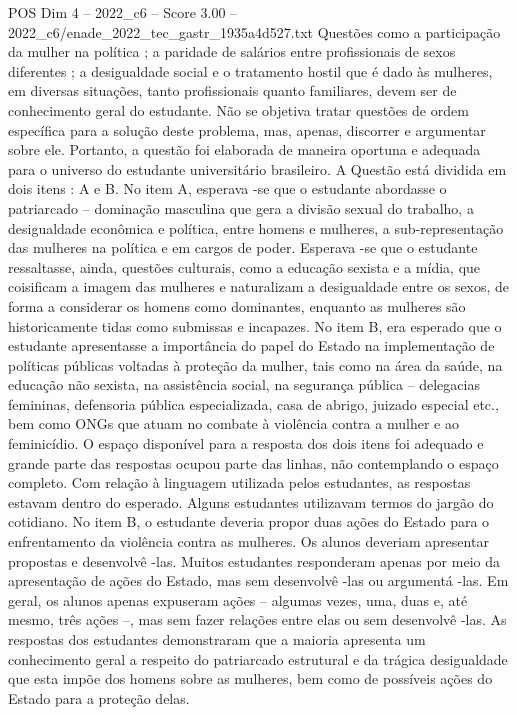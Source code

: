 \begin{textsample}{POS Dim 4 – 2022\_c6 – Score 3.00 – 2022\_c6/enade\_2022\_tec\_gastr\_1935a4d527.txt}
Questões como a participação da mulher na política ; a paridade de salários entre profissionais de sexos diferentes ; a desigualdade social e o tratamento hostil que é dado às mulheres, em diversas situações, tanto profissionais quanto familiares, devem ser de conhecimento geral do estudante.
Não se objetiva tratar questões de ordem específica para a solução deste problema, mas, apenas, discorrer e argumentar sobre ele.
Portanto, a questão foi elaborada de maneira oportuna e adequada para o universo do estudante universitário brasileiro.
A Questão está dividida em dois itens : A e B.
No item A, esperava -se que o estudante abordasse o patriarcado – dominação masculina que gera a divisão sexual do trabalho, a desigualdade econômica e política, entre homens e mulheres, a sub-representação das mulheres na política e em cargos de poder.
Esperava -se que o estudante ressaltasse, ainda, questões culturais, como a educação sexista e a mídia, que coisificam a imagem das mulheres e naturalizam a desigualdade entre os sexos, de forma a considerar os homens como dominantes, enquanto as mulheres são historicamente tidas como submissas e incapazes.
No item B, era esperado que o estudante apresentasse a importância do papel do Estado na implementação de políticas públicas voltadas à proteção da mulher, tais como na área da saúde, na educação não sexista, na assistência social, na segurança pública – delegacias femininas, defensoria pública especializada, casa de abrigo, juizado especial etc., bem como ONGs que atuam no combate à violência contra a mulher e ao feminicídio.
O espaço disponível para a resposta dos dois itens foi adequado e grande parte das respostas ocupou parte das linhas, não contemplando o espaço completo.
Com relação à linguagem utilizada pelos estudantes, as respostas estavam dentro do esperado.
Alguns estudantes utilizavam termos do jargão do cotidiano.
No item B, o estudante deveria propor duas ações do Estado para o enfrentamento da violência contra as mulheres.
Os alunos deveriam apresentar propostas e desenvolvê -las.
Muitos estudantes responderam apenas por meio da apresentação de ações do Estado, mas sem desenvolvê -las ou argumentá -las.
Em geral, os alunos apenas expuseram ações – algumas vezes, uma, duas e, até mesmo, três ações –, mas sem fazer relações entre elas ou sem desenvolvê -las.
As respostas dos estudantes demonstraram que a maioria apresenta um conhecimento geral a respeito do patriarcado estrutural e da trágica desigualdade que esta impõe dos homens sobre as mulheres, bem como de possíveis ações do Estado para a proteção delas.

\end{textsample}

